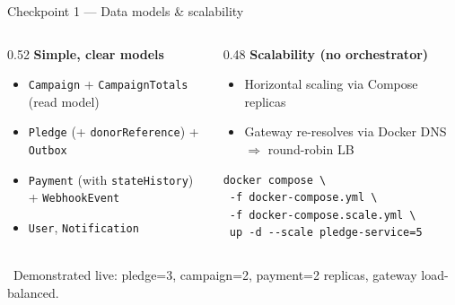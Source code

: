 \documentclass[aspectratio=169]{beamer}
\newcommand{\good}{\textcolor{brandgreen}{\textbf{\checkmark}}}
\begin{document}
\begin{frame}{Checkpoint 1 --- Data models \& scalability}
  \begin{columns}[T]
    \begin{column}{0.52\textwidth}
      \textbf{Simple, clear models}
      \begin{itemize}\scriptsize
        \item \texttt{Campaign} + \texttt{CampaignTotals} (read model)
        \item \texttt{Pledge} (+ \texttt{donorReference}) + \texttt{Outbox}
        \item \texttt{Payment} (with \texttt{stateHistory}) + \texttt{WebhookEvent}
        \item \texttt{User}, \texttt{Notification}
      \end{itemize}
    \end{column}
    \begin{column}{0.48\textwidth}
      \textbf{Scalability (no orchestrator)}
      \begin{itemize}\scriptsize
        \item Horizontal scaling via Compose replicas
        \item Gateway re-resolves via Docker DNS $\Rightarrow$ round-robin LB
      \end{itemize}
      \begin{lstlisting}
docker compose \
 -f docker-compose.yml \
 -f docker-compose.scale.yml \
 up -d --scale pledge-service=5
      \end{lstlisting}
    \end{column}
  \end{columns}
  \vspace{0.3em}
  \begin{center}\scriptsize\good\ Demonstrated live: pledge=3, campaign=2, payment=2 replicas, gateway load-balanced.\end{center}
\end{frame}
\end{document}
